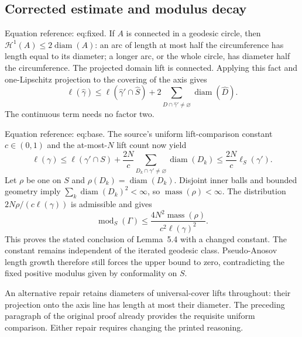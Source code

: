 \documentclass[10pt]{article}
\begin{document}
\subsection*{Corrected estimate and modulus decay}
Equation reference: eq:fixed. If \(A\) is connected in a geodesic circle, then \(\mathcal H^1(A)\le2\operatorname{diam}(A)\): an arc of length at most half the circumference has length equal to its diameter; a longer arc, or the whole circle, has diameter half the circumference. The projected domain lift is connected. Applying this fact and one-Lipschitz projection to the covering of the axis gives \[\ell(\widehat\gamma)\le
 \ell(\widehat\gamma'\cap\widehat S)
 +2\sum_{\widehat D\cap\widehat\gamma'\ne\varnothing}
       \operatorname{diam}(\widehat D).
 \] The continuous term needs no factor two.\par
Equation reference: eq:base. The source’s uniform lift-comparison constant \(c\in(0,1)\) and the at-most-\(N\) lift count now yield \[\ell(\gamma)\le
 \ell(\gamma'\cap S)+\frac{2N}{c}
     \sum_{D_k\cap\gamma'\ne\varnothing}\operatorname{diam}(D_k)
 \le\frac{2N}{c}\ell_S(\gamma').
 \] Let \(\rho\) be one on \(S\) and \(\rho(D_k)=\operatorname{diam}(D_k)\). Disjoint inner balls and bounded geometry imply \(\sum_k\operatorname{diam}(D_k)^2<\infty\), so \(\operatorname{mass}(\rho)<\infty\). The distribution \(2N\rho/(c\ell(\gamma))\) is admissible and gives \[\operatorname{mod}_S(\Gamma)\le
 \frac{4N^2\operatorname{mass}(\rho)}{c^2\ell(\gamma)^2}.\] This proves the stated conclusion of Lemma 5.4 with a changed constant. The constant remains independent of the iterated geodesic class. Pseudo-Anosov length growth therefore still forces the upper bound to zero, contradicting the fixed positive modulus given by conformality on \(S\).\par
An alternative repair retains diameters of universal-cover lifts throughout: their projection onto the axis line has length at most their diameter. The preceding paragraph of the original proof already provides the requisite uniform comparison. Either repair requires changing the printed reasoning.\par
\end{document}
